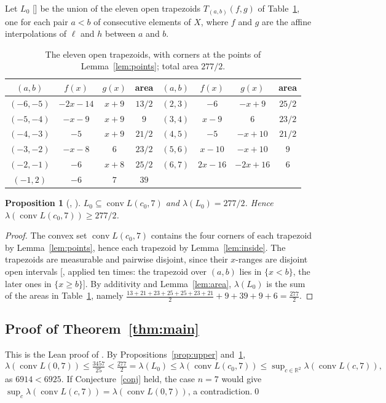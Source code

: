 \documentclass[11pt]{amsart}
\theoremstyle{plain}
\newtheorem{proposition}[theorem]{Proposition}
\theoremstyle{definition}
\newcommand{\R}{\mathbb{R}}
\DeclareMathOperator{\conv}{conv}
\newcommand{\vol}{\lambda}
\begin{document}
Let $L_0$ [] be the union of the eleven open trapezoids $T_{(a,b)}(f,g)$ of Table~\ref{tab:lower}, one for each pair $a<b$ of consecutive elements of $X$, where $f$ and $g$ are the affine interpolations of $\ell$ and $h$ between $a$ and $b$.

\begin{table}[ht]
\centering\small
\begin{tabular}{cccc@{\qquad}cccc}
\toprule
$(a,b)$ & $f(x)$ & $g(x)$ & area & $(a,b)$ & $f(x)$ & $g(x)$ & area\\
\midrule
$(-6,-5)$ & $-2x-14$ & $x+9$ & $13/2$ & $(2,3)$ & $-6$ & $-x+9$ & $25/2$\\
$(-5,-4)$ & $-x-9$ & $x+9$ & $9$ & $(3,4)$ & $x-9$ & $6$ & $23/2$\\
$(-4,-3)$ & $-5$ & $x+9$ & $21/2$ & $(4,5)$ & $-5$ & $-x+10$ & $21/2$\\
$(-3,-2)$ & $-x-8$ & $6$ & $23/2$ & $(5,6)$ & $x-10$ & $-x+10$ & $9$\\
$(-2,-1)$ & $-6$ & $x+8$ & $25/2$ & $(6,7)$ & $2x-16$ & $-2x+16$ & $6$\\
$(-1,2)$ & $-6$ & $7$ & $39$ & & & & \\
\bottomrule
\end{tabular}
\caption{The eleven open trapezoids, with corners at the points of Lemma~\ref{lem:points}; total area $277/2$.}\label{tab:lower}
\end{table}

\begin{proposition}[, ]\label{prop:lower}
$L_0\subseteq\conv L(c_0,7)$ and $\vol(L_0)=277/2$. Hence $\vol(\conv L(c_0,7))\ge277/2$.
\end{proposition}

\begin{proof}
The convex set $\conv L(c_0,7)$ contains the four corners of each trapezoid by Lemma~\ref{lem:points}, hence each trapezoid by Lemma~\ref{lem:inside}.
The trapezoids are measurable and pairwise disjoint, since their $x$-ranges are disjoint open intervals [, applied ten times: the trapezoid over $(a,b)$ lies in $\{x<b\}$, the later ones in $\{x\ge b\}$]. By additivity and Lemma~\ref{lem:area}, $\vol(L_0)$ is the sum of the areas in Table~\ref{tab:lower}, namely $\tfrac{13+21+23+25+25+23+21}{2}+9+39+9+6=\tfrac{277}{2}$.
\end{proof}

\subsection{Proof of Theorem~\ref{thm:main}}\label{sec:final}
This is the Lean proof of . By Propositions~\ref{prop:upper} and~\ref{prop:lower},
\[
  \vol(\conv L(0,7))\le\tfrac{3457}{25}<\tfrac{277}{2}=\vol(L_0)\le\vol(\conv L(c_0,7))\le\sup\nolimits_{c\in\R^2}\vol(\conv L(c,7)),
\]
as $6914<6925$. If Conjecture~\ref{conj} held, the case $n=7$ would give $\sup_c\vol(\conv L(c,7))=\vol(\conv L(0,7))$, a contradiction.\qed
\end{document}
